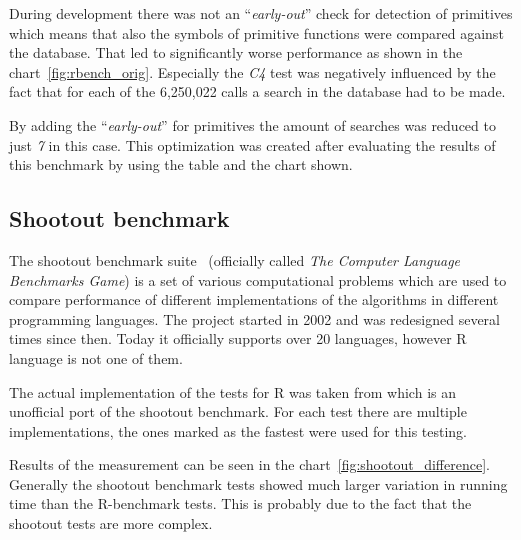 \documentclass[thesis=M,english,hidelinks]{FITthesis}[2012/10/20]
\newcommand*{\qt}[1]{\enquote{{\itshape#1}}}
\begin{document}
		During development there was not an \qt{early-out} check for detection of primitives which means that also the symbols of primitive functions were compared against the database. That led to significantly worse performance as shown in the chart~\ref{fig:rbench_orig}. Especially the \emph{C4} test was negatively influenced by the fact that for each of the 6,250,022 calls a search in the database had to be made.\par
		
		By adding the \qt{early-out} for primitives the amount of searches was reduced to just \emph{7} in this case. This optimization was created after evaluating the results of this benchmark by using the table and the chart shown.\par
		
		\subsection{Shootout benchmark}
		The shootout benchmark suite~\cite{shootout} (officially called \emph{The Computer Language Benchmarks Game}) is a set of various computational problems which are used to compare performance of different implementations of the algorithms in different programming languages. The project started in 2002 and was redesigned several times since then. Today it officially supports over 20 languages, however R language is not one of them.\par
		
		The actual implementation of the tests for R was taken from \cite{r_shootout} which is an unofficial port of the shootout benchmark. For each test there are multiple implementations, the ones marked as the fastest were used for this testing.\par
		
		Results of the measurement can be seen in the chart~\ref{fig:shootout_difference}. Generally the shootout benchmark tests showed much larger variation in running time than the R-benchmark tests. This is probably due to the fact that the shootout tests are more complex.\par
		
\end{document}
